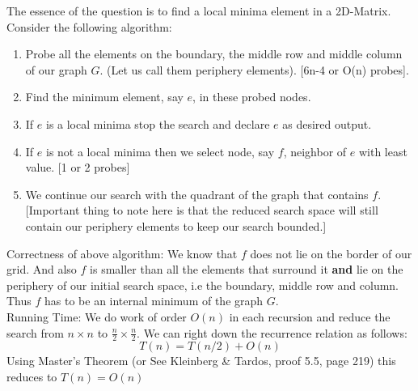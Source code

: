 \documentclass[11pt]{article}
\begin{document}
The essence of the question is to find a local minima element in a 2D-Matrix. \\

Consider the following algorithm:
\begin{enumerate}
\item  Probe all the elements on the boundary, the middle row and middle column of our graph $ G $. (Let us call them periphery elements). [6n-4  or O(n) probes].
\item  Find the minimum element, say $ e $, in these probed nodes.
\item  If $ e $ is a local minima stop the search and declare $ e $ as desired output.
\item  If $ e $ is not a local minima then we select node, say $ f $, neighbor of $ e $ with least value. [1 or 2 probes]
\item  We continue our search with the quadrant of the graph that contains $ f $. [Important thing to note here is that the reduced search space will still contain our periphery elements to keep our search bounded.]
\end{enumerate}

Correctness of above algorithm:
We know that $ f $ does not lie on the border of our grid. And also $ f $ is smaller than all the elements that surround it \textbf{and} lie on the periphery of our initial search space, i.e the boundary, middle row and column. Thus $ f $ has to be an internal minimum of the graph $ G $. \\

Running Time:
We do work of order $ O(n) $ in each recursion and reduce the search from $ n \times n $ to $ \frac{n}{2} \times \frac{n}{2} $. We can right down the recurrence relation as follows:
\begin{equation*}
T(n) = T(n/2) + O(n)
\end{equation*}
Using Master's Theorem (or See Kleinberg \& Tardos, proof 5.5, page 219) this reduces to $ T(n) = O(n) $
\end{document}
